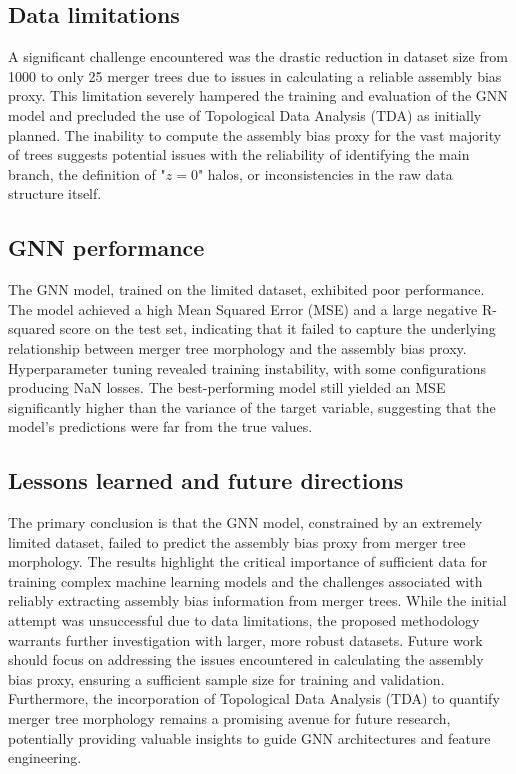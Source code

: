 \documentclass[twocolumn]{aastex631}
\begin{document}
\subsection{Data limitations}

A significant challenge encountered was the drastic reduction in dataset size from 1000 to only 25 merger trees due to issues in calculating a reliable assembly bias proxy. This limitation severely hampered the training and evaluation of the GNN model and precluded the use of Topological Data Analysis (TDA) as initially planned. The inability to compute the assembly bias proxy for the vast majority of trees suggests potential issues with the reliability of identifying the main branch, the definition of "$z=0$" halos, or inconsistencies in the raw data structure itself.

\subsection{GNN performance}

The GNN model, trained on the limited dataset, exhibited poor performance. The model achieved a high Mean Squared Error (MSE) and a large negative R-squared score on the test set, indicating that it failed to capture the underlying relationship between merger tree morphology and the assembly bias proxy. Hyperparameter tuning revealed training instability, with some configurations producing NaN losses. The best-performing model still yielded an MSE significantly higher than the variance of the target variable, suggesting that the model's predictions were far from the true values.

\subsection{Lessons learned and future directions}

The primary conclusion is that the GNN model, constrained by an extremely limited dataset, failed to predict the assembly bias proxy from merger tree morphology. The results highlight the critical importance of sufficient data for training complex machine learning models and the challenges associated with reliably extracting assembly bias information from merger trees. While the initial attempt was unsuccessful due to data limitations, the proposed methodology warrants further investigation with larger, more robust datasets. Future work should focus on addressing the issues encountered in calculating the assembly bias proxy, ensuring a sufficient sample size for training and validation. Furthermore, the incorporation of Topological Data Analysis (TDA) to quantify merger tree morphology remains a promising avenue for future research, potentially providing valuable insights to guide GNN architectures and feature engineering.
\

{}

\end{document}

